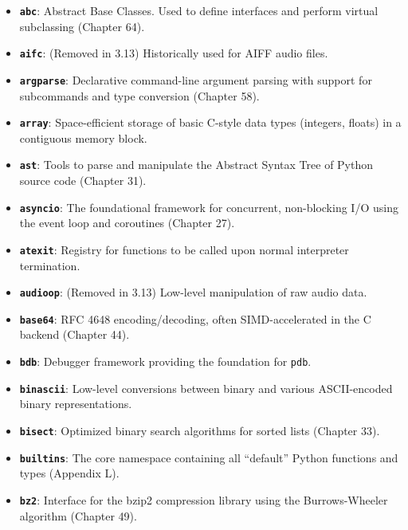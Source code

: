 \begin{itemize}
\tightlist
\item
  \textbf{\passthrough{\lstinline!abc!}}: Abstract Base Classes. Used to
  define interfaces and perform virtual subclassing (Chapter 64).
\item
  \textbf{\passthrough{\lstinline!aifc!}}: (Removed in 3.13)
  Historically used for AIFF audio files.
\item
  \textbf{\passthrough{\lstinline!argparse!}}: Declarative command-line
  argument parsing with support for subcommands and type conversion
  (Chapter 58).
\item
  \textbf{\passthrough{\lstinline!array!}}: Space-efficient storage of
  basic C-style data types (integers, floats) in a contiguous memory
  block.
\item
  \textbf{\passthrough{\lstinline!ast!}}: Tools to parse and manipulate
  the Abstract Syntax Tree of Python source code (Chapter 31).
\item
  \textbf{\passthrough{\lstinline!asyncio!}}: The foundational framework
  for concurrent, non-blocking I/O using the event loop and coroutines
  (Chapter 27).
\item
  \textbf{\passthrough{\lstinline!atexit!}}: Registry for functions to
  be called upon normal interpreter termination.
\item
  \textbf{\passthrough{\lstinline!audioop!}}: (Removed in 3.13)
  Low-level manipulation of raw audio data.
\item
  \textbf{\passthrough{\lstinline!base64!}}: RFC 4648 encoding/decoding,
  often SIMD-accelerated in the C backend (Chapter 44).
\item
  \textbf{\passthrough{\lstinline!bdb!}}: Debugger framework providing
  the foundation for \passthrough{\lstinline!pdb!}.
\item
  \textbf{\passthrough{\lstinline!binascii!}}: Low-level conversions
  between binary and various ASCII-encoded binary representations.
\item
  \textbf{\passthrough{\lstinline!bisect!}}: Optimized binary search
  algorithms for sorted lists (Chapter 33).
\item
  \textbf{\passthrough{\lstinline!builtins!}}: The core namespace
  containing all ``default'' Python functions and types (Appendix L).
\item
  \textbf{\passthrough{\lstinline!bz2!}}: Interface for the bzip2
  compression library using the Burrows-Wheeler algorithm (Chapter 49).
\end{itemize}

